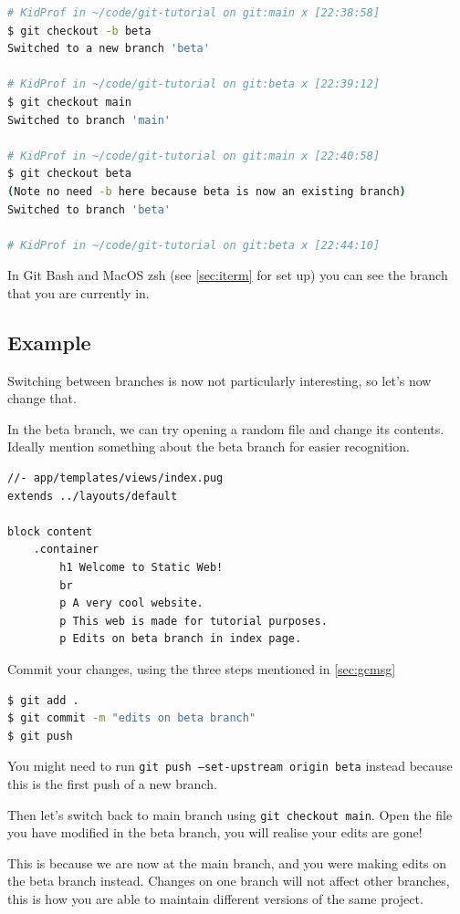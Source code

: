 \begin{lstlisting}[language=bash]
# KidProf in ~/code/git-tutorial on git:main x [22:38:58]
$ git checkout -b beta
Switched to a new branch 'beta'

# KidProf in ~/code/git-tutorial on git:beta x [22:39:12]
$ git checkout main
Switched to branch 'main'

# KidProf in ~/code/git-tutorial on git:main x [22:40:58]
$ git checkout beta
(Note no need -b here because beta is now an existing branch)
Switched to branch 'beta'

# KidProf in ~/code/git-tutorial on git:beta x [22:44:10]
\end{lstlisting}

In Git Bash and MacOS zsh (see \cref{sec:iterm} for set up) you can see the branch that you are currently in.

\subsection*{Example}

Switching between branches is now not particularly interesting, so let's now change that.

In the beta branch, we can try opening a random file and change its contents. Ideally mention something about the beta branch for easier recognition.

\begin{lstlisting}[language=pug]
//- app/templates/views/index.pug
extends ../layouts/default

block content
	.container
		h1 Welcome to Static Web!
		br
		p A very cool website.
		p This web is made for tutorial purposes.
		p Edits on beta branch in index page.
\end{lstlisting}

Commit your changes, using the three steps mentioned in \cref{sec:gcmsg}

\begin{lstlisting}[language=bash]
$ git add .
$ git commit -m "edits on beta branch"
$ git push
\end{lstlisting}

You might need to run \texttt{git push --set-upstream origin beta} instead because this is the first push of a new branch. 

Then let's switch back to main branch using \texttt{git checkout main}. Open the file you have modified in the beta branch, you will realise your edits are gone!

This is because we are now at the main branch, and you were making edits on the beta branch instead. Changes on one branch will not affect other branches, this is how you are able to maintain different versions of the same project.

